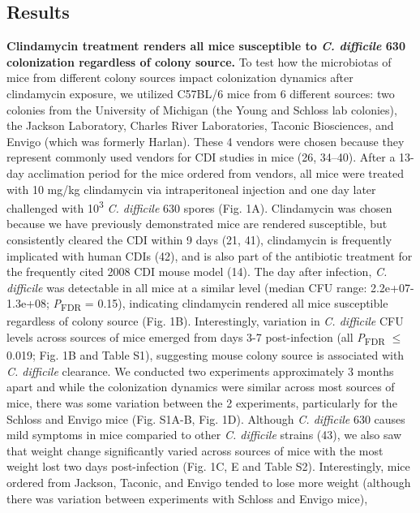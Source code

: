 \documentclass[11pt,]{article}
\begin{document}
\subsection{Results}\label{results}

\textbf{Clindamycin treatment renders all mice susceptible to \emph{C.
difficile} 630 colonization regardless of colony source.} To test how
the microbiotas of mice from different colony sources impact
colonization dynamics after clindamycin exposure, we utilized C57BL/6
mice from 6 different sources: two colonies from the University of
Michigan (the Young and Schloss lab colonies), the Jackson Laboratory,
Charles River Laboratories, Taconic Biosciences, and Envigo (which was
formerly Harlan). These 4 vendors were chosen because they represent
commonly used vendors for CDI studies in mice (26, 34--40). After a
13-day acclimation period for the mice ordered from vendors, all mice
were treated with 10 mg/kg clindamycin via intraperitoneal injection and
one day later challenged with 10\textsuperscript{3} \emph{C. difficile}
630 spores (Fig. 1A). Clindamycin was chosen because we have previously
demonstrated mice are rendered susceptible, but consistently cleared the
CDI within 9 days (21, 41), clindamycin is frequently implicated with
human CDIs (42), and is also part of the antibiotic treatment for the
frequently cited 2008 CDI mouse model (14). The day after infection,
\emph{C. difficile} was detectable in all mice at a similar level
(median CFU range: 2.2e+07-1.3e+08; \emph{P}\textsubscript{FDR} = 0.15),
indicating clindamycin rendered all mice susceptible regardless of
colony source (Fig. 1B). Interestingly, variation in \emph{C. difficile}
CFU levels across sources of mice emerged from days 3-7 post-infection
(all \emph{P}\textsubscript{FDR} \(\le\) 0.019; Fig. 1B and Table S1),
suggesting mouse colony source is associated with \emph{C. difficile}
clearance. We conducted two experiments approximately 3 months apart and
while the colonization dynamics were similar across most sources of
mice, there was some variation between the 2 experiments, particularly
for the Schloss and Envigo mice (Fig. S1A-B, Fig. 1D). Although \emph{C.
difficile} 630 causes mild symptoms in mice comparied to other \emph{C.
difficile} strains (43), we also saw that weight change significantly
varied across sources of mice with the most weight lost two days
post-infection (Fig. 1C, E and Table S2). Interestingly, mice ordered
from Jackson, Taconic, and Envigo tended to lose more weight (although
there was variation between experiments with Schloss and Envigo mice),
\end{document}
